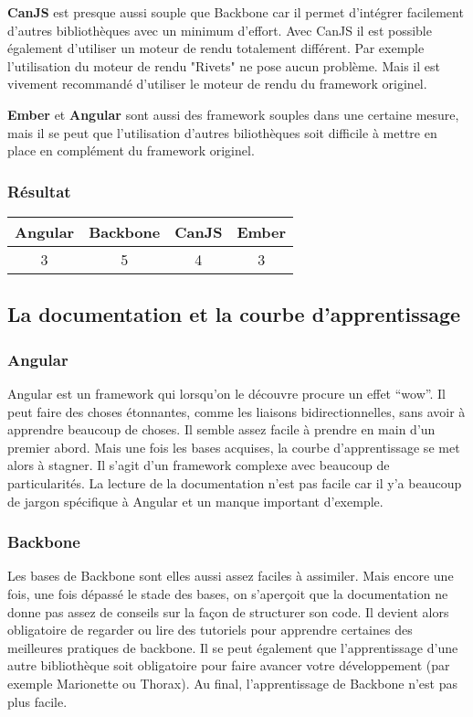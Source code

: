\textbf{CanJS} est presque aussi souple que Backbone car il permet d’intégrer facilement d’autres bibliothèques avec un minimum d’effort. Avec CanJS il est possible également d’utiliser un moteur de rendu totalement différent. Par exemple l’utilisation du moteur de rendu "Rivets" ne pose aucun problème. Mais il est vivement recommandé d’utiliser le moteur de rendu du framework originel.

\textbf{Ember} et \textbf{Angular} sont aussi des framework souples dans une certaine mesure, mais il se peut que l’utilisation d’autres biliothèques soit difficile à mettre en place en complément du framework originel.


\subsubsection{Résultat}
\begin{tabular}{|c|c|c|c|}
  \hline 
  Angular & Backbone & CanJS & Ember \\
  \hline 
  3 & 5 & 4 & 3 \\
  \hline
\end{tabular}


\subsection{La documentation et la courbe d'apprentissage}

\subsubsection{Angular}

Angular est un framework qui lorsqu’on le découvre procure un effet “wow”. Il peut faire des choses étonnantes, comme les liaisons bidirectionnelles, sans avoir à apprendre beaucoup de choses. Il semble assez facile à prendre en main d'un premier abord. Mais une fois les bases acquises, la courbe d’apprentissage se met alors à stagner. Il s’agit d’un framework complexe avec beaucoup de particularités. La lecture de la documentation n’est pas facile car il y’a beaucoup de jargon spécifique à Angular et un manque important d’exemple.

\subsubsection{Backbone}

Les bases de Backbone sont elles aussi assez faciles à assimiler. Mais encore une fois, une fois dépassé le stade des bases, on s'aperçoit que la documentation ne donne pas assez de conseils sur la façon de structurer son code. Il devient alors obligatoire de regarder ou lire des tutoriels pour apprendre certaines des meilleures pratiques de backbone. Il se peut également que l’apprentissage d’une autre bibliothèque soit obligatoire pour faire avancer votre développement (par exemple Marionette ou Thorax). Au final, l’apprentissage de Backbone n’est pas plus facile.

